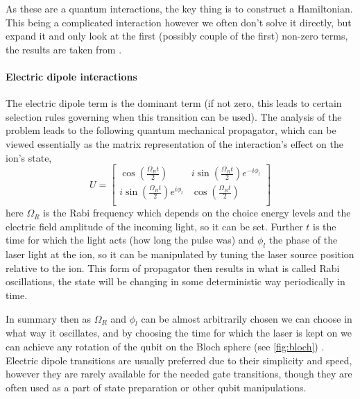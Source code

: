 As these are a quantum interactions, the key thing is to construct a Hamiltonian.
This being a complicated interaction however we often don't solve it directly, but expand it and only look at the first (possibly couple of the first) non-zero terms, the results are taken from \cite{schaferFastGatesMixedSpecies2020}.

\paragraph{Electric dipole interactions}
The electric dipole term is the dominant term (if not zero, this leads to certain selection rules governing when this transition can be used).
The analysis of the problem leads to the following quantum mechanical propagator\footnotemark, which can be viewed essentially as the matrix representation of the interaction's effect on the ion's state,
\begin{equation}
    U = \begin{bmatrix}
        \cos{(\frac{\Omega_R t}{2})} & i \sin{(\frac{\Omega_R t}{2})} e^{-i \phi_l} \\
        i \sin{(\frac{\Omega_R t}{2})} e^{i \phi_l} & \cos{(\frac{\Omega_R t}{2})} \\
    \end{bmatrix}
\end{equation}
here $\Omega_R$ is the Rabi frequency which depends on the choice energy levels and the electric field amplitude of the incoming light, so it can be set.
Further $t$ is the time for which the light acts (how long the pulse was) and $\phi_l$ the phase of the laser light at the ion, so it can be manipulated by tuning the laser source position relative to the ion.
This form of propagator then results in what is called Rabi oscillations, the state will be changing in some deterministic way periodically in time.

In summary then as $\Omega_R$ and $\phi_l$ can be almost arbitrarily chosen we can choose in what way it oscillates, and by choosing the time for which the laser is kept on we can achieve any rotation of the qubit on the Bloch sphere (see \cref{fig:bloch}) \cite{schaferFastGatesMixedSpecies2020}.
Electric dipole transitions are usually preferred due to their simplicity and speed, however they are rarely available for the needed gate transitions, though they are often used as a part of state preparation or other qubit manipulations.

